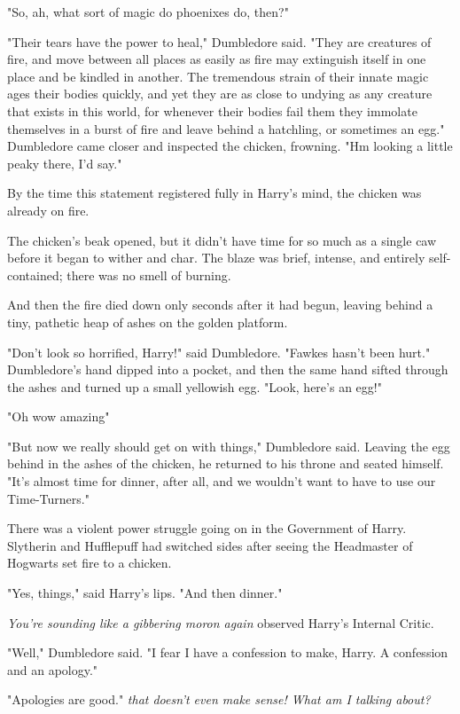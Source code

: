 "So, ah, what sort of magic do phoenixes do, then?"

"Their tears have the power to heal," Dumbledore said. "They are creatures of
fire, and move between all places as easily as fire may extinguish itself in
one place and be kindled in another. The tremendous strain of their innate
magic ages their bodies quickly, and yet they are as close to undying as any
creature that exists in this world, for whenever their bodies fail them they
immolate themselves in a burst of fire and leave behind a hatchling, or
sometimes an egg." Dumbledore came closer and inspected the chicken, frowning.
"Hm{\el} looking a little peaky there, I'd say."

By the time this statement registered fully in Harry's mind, the chicken was
already on fire.

The chicken's beak opened, but it didn't have time for so much as a single caw
before it began to wither and char. The blaze was brief, intense, and entirely
self-contained; there was no smell of burning.

And then the fire died down only seconds after it had begun, leaving behind a
tiny, pathetic heap of ashes on the golden platform.

"Don't look so horrified, Harry!" said Dumbledore. "Fawkes hasn't been hurt."
Dumbledore's hand dipped into a pocket, and then the same hand sifted through
the ashes and turned up a small yellowish egg. "Look, here's an egg!"

"Oh{\el} wow{\el} amazing{\el}"

"But now we really should get on with things," Dumbledore said. Leaving the egg
behind in the ashes of the chicken, he returned to his throne and seated
himself. "It's almost time for dinner, after all, and we wouldn't want to have
to use our Time-Turners."

There was a violent power struggle going on in the Government of Harry.
Slytherin and Hufflepuff had switched sides after seeing the Headmaster of
Hogwarts set fire to a chicken.

"Yes, things," said Harry's lips. "And then dinner."

\emph{You're sounding like a gibbering moron again} observed Harry's Internal
Critic.

"Well," Dumbledore said. "I fear I have a confession to make, Harry. A
confession and an apology."

"Apologies are good." \emph{{\el} that doesn't even make sense! What am I talking
about?}

